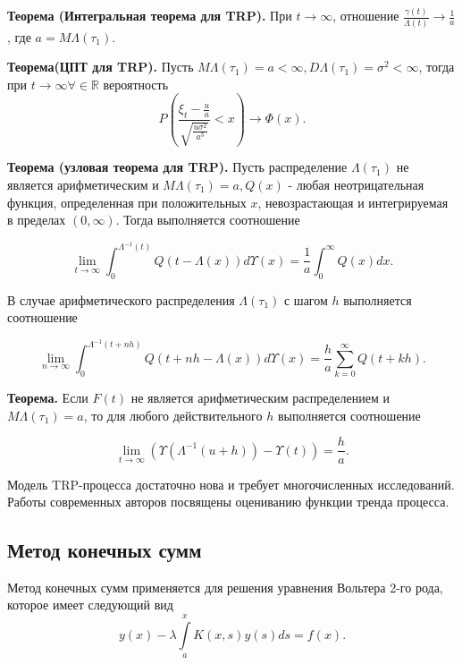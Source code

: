 {\bfseries Теорема (Интегральная теорема для TRP).} При ${t \to \infty}$, отношение ${\frac{\gamma(t)}{\Lambda(t)} \to \frac{1}{a}}$, где $a = M\Lambda(\tau_1)$. 

{\bfseries Теорема(ЦПТ для TRP).} Пусть $M\Lambda(\tau_1) =  a < \infty, D\Lambda(\tau_1) = \sigma^2 < \infty$, тогда при $ {t \to \infty} \forall \in \mathbb{R} $ вероятность
\begin{equation}
P(\frac{\xi_t - \frac{u}{a}}{\sqrt{\frac{u\sigma^2}{a^3}}} < x) \to \Phi(x).
\end{equation}

{\bfseries Теорема (узловая теорема для TRP).} Пусть распределение $\Lambda(\tau_1)$ не является арифметическим и $M\Lambda(\tau_1) = a, Q(x)$ - любая неотрицательная функция, определенная при положительных $x$, невозрастающая и интегрируемая в пределах $(0, \infty)$. Тогда выполняется соотношение

\begin{equation}
\lim_{t \to \infty} \int_0^{\Lambda^{-1}(t)} Q(t - \Lambda(x)) d\Upsilon(x) = \frac{1}{a} \int_0^\infty Q(x) d x.
\end{equation}

В случае арифметического распределения $\Lambda(\tau_1)$  с шагом $h$ выполняется соотношение

\begin{equation}
\lim_{n \to \infty} \int_0^{\Lambda^{-1}(t + nh)} Q(t + nh - \Lambda(x)) d\Upsilon(x) = \frac{h}{a} \sum_{k = 0}^\infty Q(t + kh) .
\end{equation}

{\bfseries Теорема.} Если $F(t)$ не является арифметическим распределением и $M\Lambda(\tau_1) = a$, то для любого действительного $h$ выполняется соотношение

 \begin{equation}
\lim_{t \to \infty} (\Upsilon(\Lambda^{-1}(u + h)) - \Upsilon(t)) = \frac{h}{a}.
\end{equation}

Модель TRP-процесса достаточно нова и требует многочисленных исследований. Работы современных авторов посвящены оцениванию функции тренда процесса.

\begin{center}
\item\subsection{Метод конечных сумм}
\end{center}
Метод конечных сумм применяется для решения уравнения Вольтера 2-го рода, которое имеет следующий вид
\begin{equation}
y(x) - \lambda \int\limits_a^x K(x, s) y(s) ds = f(x).
\end{equation}

